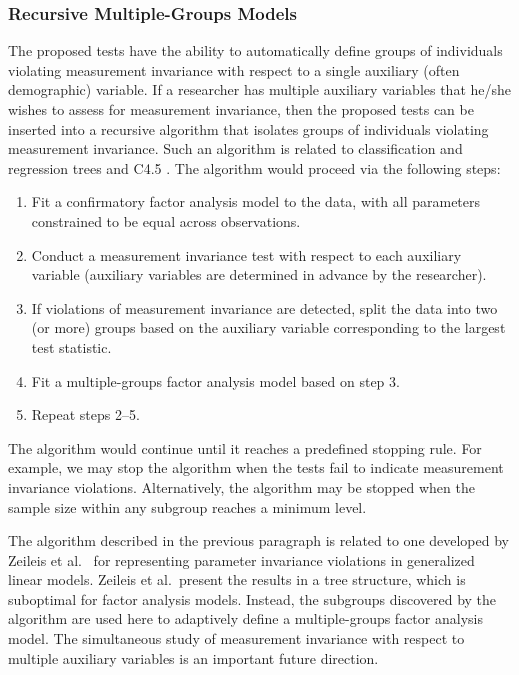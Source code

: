 \documentclass[man]{apa}
\begin{document}
\subsubsection{Recursive Multiple-Groups Models}
The proposed tests have the ability to automatically define groups of
individuals violating measurement invariance with respect to a single
auxiliary (often demographic) variable.  If a researcher has multiple
auxiliary variables that he/she wishes to assess for measurement
invariance, then the proposed tests can be inserted into a recursive
algorithm 
that isolates groups of individuals violating measurement
invariance.  Such an algorithm is related to 
classification and regression trees \cite{BreFri84,MerSha10,StrMal09} and
C4.5 \cite{Qui93}.  The algorithm would proceed via the following
steps: 
\begin{enumerate}
  \item Fit a confirmatory factor analysis model to the data, with all
  parameters constrained to be equal across observations.
  \item Conduct a measurement invariance test with respect to each
    auxiliary variable (auxiliary variables are determined in
    advance by the researcher).
  \item If violations of measurement invariance are detected,
  split the data into two (or more) groups based on the auxiliary variable
    corresponding to the largest test statistic.
  \item Fit a multiple-groups factor analysis model based on step 3.
  \item Repeat steps 2--5.
\end{enumerate}
The algorithm would continue until it reaches a
predefined stopping rule.  For example, we may stop 
the algorithm when the tests fail to indicate measurement invariance
violations.  Alternatively, the algorithm may be stopped when the
sample size within any subgroup reaches a minimum level.

The algorithm described in the previous paragraph is related to one
developed by Zeileis et al.\ \citeyear{ZeiHot08} for representing
parameter invariance violations in generalized linear models.  Zeileis
et al.\ present the results in a tree structure, which is
suboptimal for factor analysis models.  Instead, the subgroups
discovered by the algorithm are used here to adaptively define a
multiple-groups factor analysis model.  The
simultaneous study of measurement invariance with respect to multiple
auxiliary variables is an important future direction.
\end{document}
